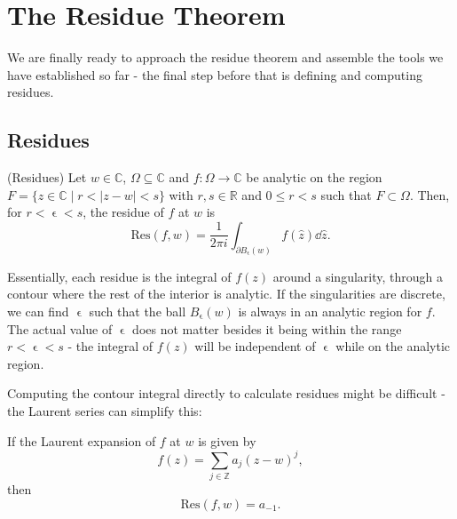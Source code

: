 \documentclass[a4paper]{article}
\def\Res{\text{Res}}
\begin{document}
\section{The Residue Theorem}

We are finally ready to approach the residue theorem and assemble the tools we have established so far - the final step before that is defining and computing residues.

\subsection{Residues}



\begin{definition}{(Residues) \citep[p.5]{Mitrinovic}}{} \label{thm:residuedef}
Let $w \in \mathbb{C}$, $\Omega \subseteq \mathbb{C}$ and $f: \Omega \rightarrow \mathbb{C}$ be analytic on the region $F = \{z \in \mathbb{C} \mid r < |z-w|< s\} $ with $r,s \in \mathbb{R}$ and $0\leq r<s$ such that $F \subset \Omega$. Then, for $r< \upvarepsilon <s$, the residue of $f$ at $w$ is
\[\Res (f,w) = \frac{1}{2\pi i}\int_{\partial B_{\upvarepsilon}(w)} f(\hat{z}) \dd \hat{z}.\]

\end{definition}

Essentially, each residue is the integral of $f(z)$ around a singularity, through a contour where the rest of the interior is analytic. If the singularities are discrete, we can find $\upvarepsilon$ such that the ball $B_{\upvarepsilon}(w)$ is always in an analytic region for $f$. The actual value of $\upvarepsilon$ does not matter besides it being within the range $r< \upvarepsilon <s$ - the integral of $f(z)$ will be independent of $\upvarepsilon$ while on the analytic region.

Computing the contour integral directly to calculate residues might be difficult - the Laurent series can simplify this:

\begin{lemma}{\citep[p.5]{Mitrinovic}}{}
If the Laurent expansion of $f$ at $w$ is given by
\[f(z) = \sum_{j \in \mathbb{Z}} a_{j}(z-w)^{j},\]
then 
\[\Res (f,w) = a_{-1}.\]

\end{lemma}
\end{document}
